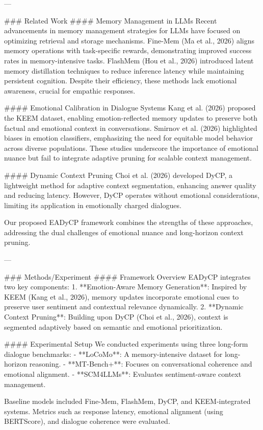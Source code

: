 ---

### Related Work
#### Memory Management in LLMs
Recent advancements in memory management strategies for LLMs have focused on optimizing retrieval and storage mechanisms. Fine-Mem (Ma et al., 2026) aligns memory operations with task-specific rewards, demonstrating improved success rates in memory-intensive tasks. FlashMem (Hou et al., 2026) introduced latent memory distillation techniques to reduce inference latency while maintaining persistent cognition. Despite their efficiency, these methods lack emotional awareness, crucial for empathic responses.

#### Emotional Calibration in Dialogue Systems
Kang et al. (2026) proposed the KEEM dataset, enabling emotion-reflected memory updates to preserve both factual and emotional context in conversations. Smirnov et al. (2026) highlighted biases in emotion classifiers, emphasizing the need for equitable model behavior across diverse populations. These studies underscore the importance of emotional nuance but fail to integrate adaptive pruning for scalable context management.

#### Dynamic Context Pruning
Choi et al. (2026) developed DyCP, a lightweight method for adaptive context segmentation, enhancing answer quality and reducing latency. However, DyCP operates without emotional considerations, limiting its application in emotionally charged dialogues.

Our proposed EADyCP framework combines the strengths of these approaches, addressing the dual challenges of emotional nuance and long-horizon context pruning.

---

### Methods/Experiment
#### Framework Overview
EADyCP integrates two key components:
1. **Emotion-Aware Memory Generation**: Inspired by KEEM (Kang et al., 2026), memory updates incorporate emotional cues to preserve user sentiment and contextual relevance dynamically.
2. **Dynamic Context Pruning**: Building upon DyCP (Choi et al., 2026), context is segmented adaptively based on semantic and emotional prioritization.

#### Experimental Setup
We conducted experiments using three long-form dialogue benchmarks:
- **LoCoMo**: A memory-intensive dataset for long-horizon reasoning.
- **MT-Bench+**: Focuses on conversational coherence and emotional alignment.
- **SCM4LLMs**: Evaluates sentiment-aware context management.

Baseline models included Fine-Mem, FlashMem, DyCP, and KEEM-integrated systems. Metrics such as response latency, emotional alignment (using BERTScore), and dialogue coherence were evaluated.

